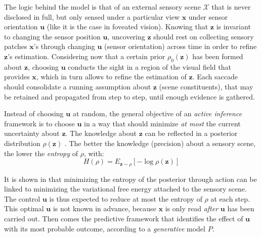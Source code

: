 \documentclass{article} %
\begin{document}
The logic behind the model is that of an external sensory scene $\mathcal{X}$ that is never disclosed in full, but only sensed under a particular view $\boldsymbol{x}$ under sensor orientation $\boldsymbol{u}$ (like it is the case in foveated vision). 
Knowing that $\boldsymbol{z}$ is invariant to changing the sensor position $\boldsymbol{u}$, uncovering $\boldsymbol{z}$ should rest on
collecting sensory patches $\boldsymbol{x}$'s through changing $\boldsymbol{u}$ (sensor orientation) across time in order to refine $\boldsymbol{z}$'s estimation. 
Considering now that a certain prior $\rho_0
(\boldsymbol{z})$ has been formed about $\boldsymbol{z}$, choosing  $\boldsymbol{u}$ conducts the sight in a region of the visual field that provides $\boldsymbol{x}$, which in turn allows to refine the estimation of $\boldsymbol{z}$.
Each saccade should consolidate a running assumption about $\boldsymbol{z}$ (scene constituents), that may be retained and propagated from step to step, until enough evidence is gathered.

Instead of choosing $\boldsymbol{u}$ at random, the general objective of an \emph{active inference} framework is to choose $\boldsymbol{u}$ in a way that should minimize \emph{at most} the current uncertainty about $\boldsymbol{z}$. 
The knowledge about $\boldsymbol{z}$ can be reflected in a posterior distribution $\rho(\boldsymbol{z})$ . The better the knowledge (precision) about a sensory scene, the lower the \emph{entropy} of $\rho$, with:
\begin{equation}
H(\rho) = E_{\boldsymbol{z}\sim \rho}[- \log \rho(\boldsymbol{z})]\label{eq:entropy}
\end{equation}

It is shown in \cite{friston2012perceptions} that minimizing the entropy of the posterior through action can be linked to minimizing the variational free energy attached to the sensory scene. 
The control $\boldsymbol{u}$ is thus expected to reduce at most the entropy of $\rho$ at each step. This optimal $\boldsymbol{u}$ is not known in advance, because $\boldsymbol{x}$ is only read \emph{after} $\boldsymbol{u}$ has been carried out. Then comes the predictive framework that identifies the effect of $\boldsymbol{u}$ with its most probable outcome, according to a \emph{generative} model $P$.
	
\end{document}
